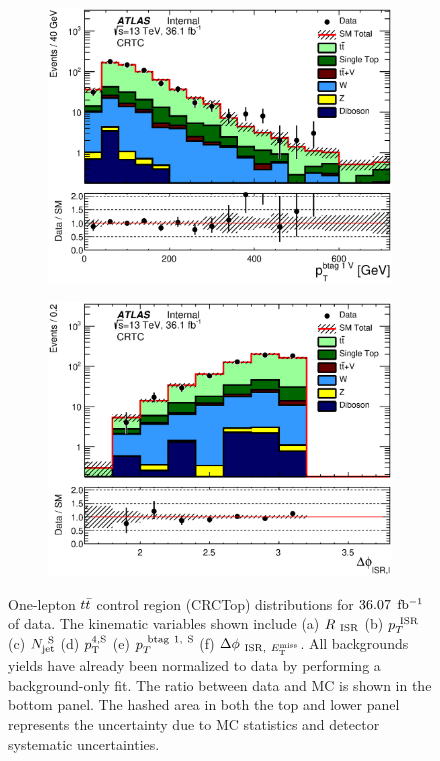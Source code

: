 \begin{figure}[h!]
\begin{subfigure}[b]{0.40\textwidth}
    \includegraphics[width=\textwidth]{figures/ttbar/postfit/CA_pTbV1_CRTopC_log}
               \caption{ }
    \end{subfigure}
            \begin{subfigure}[b]{0.40\textwidth}  
    \includegraphics[width=\textwidth]{figures/ttbar/postfit/CA_dphiISRI_CRTopC_log}
               \caption{ }
    \end{subfigure}
       \caption[One-lepton $\ttbar$ control region (CRTopC) distributions for $\intlumi$ $\ifb$ of data]{One-lepton $\ttbar$ control region (CRCTop) distributions for $\intlumi$ $\ifb$ of data.  The kinematic variables shown include (a) $R_{~\mathrm{ISR}}$ (b) $p_{T}^{~\mathrm{ISR}}$ (c) $N_{\mathrm{jet}}^{~\mathrm{S}}$ (d) $p_{\mathrm{T}}^{4,\mathrm{S}}$ (e) $p_{T}^{~\mathrm{btag~1,~S}}$ (f) $\Delta\phi_{~\mathrm{ISR},~E_{\mathrm{T}}^{\mathrm{miss}}}$.  All backgrounds yields have already been normalized to data by performing a background-only fit.  The ratio between data and MC is shown in the bottom panel. The hashed area in both the top and lower panel represents the uncertainty due to MC statistics and detector systematic uncertainties.}
  \label{fig:CRTopC2}
\end{figure}

